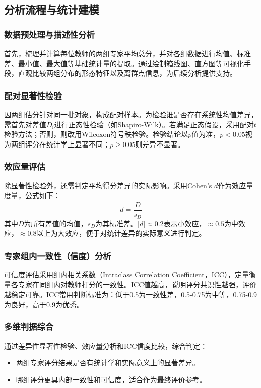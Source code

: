 \subsection{分析流程与统计建模}
\subsubsection{数据预处理与描述性分析}
首先，梳理并计算每位教师的两组专家平均总分，并对各组数据进行均值、标准差、最小值、最大值等基础统计量的提取。通过绘制箱线图、直方图等可视化手段，直观比较两组分布的形态特征以及离群点信息，为后续分析提供支持。

\subsubsection{配对显著性检验}
因两组估分针对同一批对象，构成配对样本。为检验谁是否存在系统性均值差异，需首先对差值$D_i$进行正态性检验（如Shapiro-Wilk）。若满足正态假设，采用配对$t$检验方法；否则，则改用Wilcoxon符号秩检验。检验结论以$p$值为准，$p<0.05$视为两组评分在统计学上显著不同；$p\geq 0.05$则差异不显著。

\subsubsection{效应量评估}
除显著性检验外，还需判定平均得分差异的实际影响。采用Cohen's $d$作为效应量度量，公式如下：
\[
d = \frac{\overline{D}}{s_D}
\]
其中$\overline{D}$为所有差值的均值，$s_D$为其标准差。$|d|\approx0.2$表示小效应，$\approx0.5$为中效应，$\approx0.8$以上为大效应，便于对统计差异的实际意义进行判定。

\subsubsection{专家组内一致性（信度）分析}
可信度评估采用组内相关系数（Intraclass Correlation Coefficient，ICC），定量衡量各专家在同组内对教师打分的一致性。ICC值越高，说明评分共识性越强，评价越稳定可靠。ICC常用判断标准为：低于0.5为一致性差，0.5-0.75为中等，0.75-0.9为良好，高于0.9为优秀。

\subsubsection{多维判据综合}
通过差异性显著性检验、效应量分析和ICC信度比较，综合判定：
\begin{itemize}
    \item 两组专家评分结果是否有统计学和实际意义上的显著差异。
    \item 哪组评分更具内部一致性和可信度，适合作为最终评价参考。
\end{itemize}

